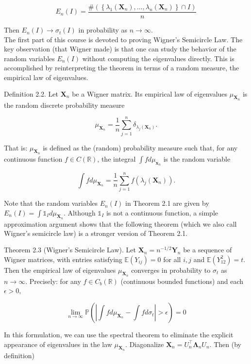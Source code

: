 \documentclass[10pt]{article}
\begin{document}
$$
E_{n}(I)=\frac{\#\left(\left\{\lambda_{1}\left(\mathbf{X}_{n}\right), \ldots, \lambda_{n}\left(\mathbf{X}_{n}\right)\right\} \cap I\right)}{n}
$$

Then $E_{n}(I) \rightarrow \sigma_{t}(I)$ in probability as $n \rightarrow \infty$.\\
The first part of this course is devoted to proving Wigner's Semicircle Law. The key observation (that Wigner made) is that one can study the behavior of the random variables $E_{n}(I)$ without computing the eigenvalues directly. This is accomplished by reinterpreting the theorem in terms of a random measure, the empirical law of eigenvalues.

Definition 2.2. Let $\mathbf{X}_{n}$ be a Wigner matrix. Its empirical law of eigenvalues $\mu_{\mathbf{X}_{n}}$ is the random discrete probability measure

$$
\mu_{\mathbf{X}_{n}}=\frac{1}{n} \sum_{j=1}^{n} \delta_{\lambda_{j}\left(\mathbf{X}_{n}\right)} .
$$

That is: $\mu_{\mathbf{X}_{n}}$ is defined as the (random) probability measure such that, for any continuous function $f \in C(\mathbb{R})$, the integral $\int f d \mu_{\mathbf{x}_{n}}$ is the random variable

$$
\int f d \mu_{\mathbf{X}_{n}}=\frac{1}{n} \sum_{j=1}^{n} f\left(\lambda_{j}\left(\mathbf{X}_{n}\right)\right) .
$$

Note that the random variables $E_{n}(I)$ in Theorem 2.1 are given by $E_{n}(I)=\int \mathbb{1}_{I} d \mu_{\mathbf{X}_{n}}$. Although $\mathbb{1}_{I}$ is not a continuous function, a simple approximation argument shows that the following theorem (which we also call Wigner's semicircle law) is a stronger version of Theorem 2.1.

Theorem 2.3 (Wigner's Semicircle Law). Let $\mathbf{X}_{n}=n^{-1 / 2} \mathbf{Y}_{n}$ be a sequence of Wigner matrices, with entries satisfying $\mathbb{E}\left(Y_{i j}\right)=0$ for all $i, j$ and $\mathbb{E}\left(Y_{12}^{2}\right)=t$. Then the empirical law of eigenvalues $\mu_{\mathbf{X}_{n}}$ converges in probability to $\sigma_{t}$ as $n \rightarrow \infty$. Precisely: for any $f \in C_{b}(\mathbb{R})$ (continuous bounded functions) and each $\epsilon>0$,

$$
\lim _{n \rightarrow \infty} \mathbb{P}\left(\left|\int f d \mu_{\mathbf{X}_{n}}-\int f d \sigma_{t}\right|>\epsilon\right)=0
$$

In this formulation, we can use the spectral theorem to eliminate the explicit appearance of eigenvalues in the law $\mu_{\mathbf{X}_{n}}$. Diagonalize $\mathbf{X}_{n}=U_{n}^{\top} \mathbf{\Lambda}_{n} U_{n}$. Then (by definition)
\end{document}
